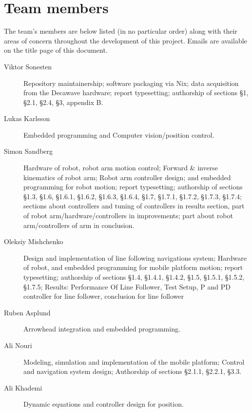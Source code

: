 \section{Team members}
The team's members are below listed (in no particular order) along with their areas of concern throughout the development of this project.
Emails are available on the title page of this document.

\begin{description}
\item[Viktor Sonesten] Repository maintainership; software packaging
  via Nix; data acquisition from the Decawave hardware; report
  typesetting; authorship of sections §1, §2.1, §2.4, §3, appendix B.

    \item[Lukas Karlsson]
    Embedded programming and
    Computer vision/position control.

    \item[Simon Sandberg]
    Hardware of robot, robot arm motion control;
    Forward & inverse kinematics of robot arm;
    Robot arm controller design;
    and embedded programming for robot motion; report
    typesetting; authorship of sections §1.3, §1.6, §1.6.1, §1.6.2, §1.6.3, §1.6.4, §1.7, §1.7.1, §1.7.2, §1.7.3, §1.7.4;
    sections about controllers and tuning of controllers in results section, part of robot arm/hardware/controllers in improvements;
    part about robot arm/controllers of arm in conclusion.

    \item[Oleksiy Mishchenko]
    Design and implementation of line following navigations system;
    Hardware of robot, and embedded programming for mobile platform motion; report
     typesetting; authorship of sections §1.4, §1.4.1, §1.4.2, §1.5, §1.5.1, §1.5.2, §1.7.5;
     Results: Performance Of Line Follower, Test Setup, P and PD controller for line follower, conclusion for line follower

    \item[Ruben Asplund]
    Arrowhead integration and embedded programming.

    \item[Ali Nouri]
    Modeling, simulation and implementation of the mobile platform;
    Control and navigation system design;
    Authorship of sections §2.1.1, §2.2.1, §3.3.  

    \item[Ali Khademi]
    Dynamic equations and controller design for position.
\end{description}

